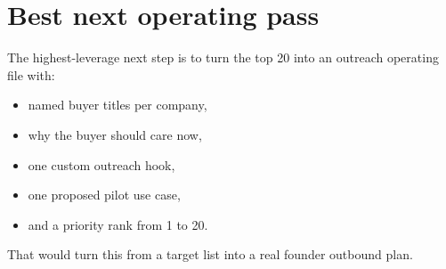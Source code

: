 \documentclass[11pt]{article}
\begin{document}
\section{Best next operating pass}
The highest-leverage next step is to turn the top 20 into an outreach operating file with:
\begin{itemize}
\item named buyer titles per company,
\item why the buyer should care now,
\item one custom outreach hook,
\item one proposed pilot use case,
\item and a priority rank from 1 to 20.
\end{itemize}
That would turn this from a target list into a real founder outbound plan.
\end{document}
